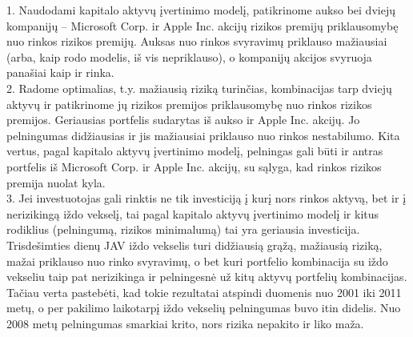 \documentclass[12pt, a14paper, lithuanian]{article}
\begin{document}
\newpage      
{}

1. Naudodami kapitalo aktyvų įvertinimo modelį, patikrinome aukso bei dviejų kompanijų -- Microsoft Corp. ir Apple Inc. akcijų rizikos premijų priklausomybę nuo rinkos rizikos premijų. Auksas nuo rinkos svyravimų priklauso mažiausiai (arba, kaip rodo modelis, iš vis nepriklauso), o kompanijų akcijos svyruoja panašiai kaip ir rinka.\\

2. Radome optimalias, t.y. mažiausią riziką turinčias, kombinacijas tarp dviejų aktyvų ir patikrinome jų rizikos premijos priklausomybę nuo rinkos rizikos premijos. Geriausias portfelis sudarytas iš aukso ir Apple Inc. akcijų. Jo pelningumas didžiausias ir jis mažiausiai priklauso nuo rinkos nestabilumo. Kita vertus, pagal kapitalo aktyvų įvertinimo modelį, pelningas gali būti ir antras portfelis iš Microsoft Corp. ir Apple Inc. akcijų, su sąlyga, kad rinkos rizikos premija nuolat kyla.\\


3. Jei investuotojas gali rinktis ne tik investiciją į kurį nors rinkos aktyvą, bet ir į nerizikingą iždo vekselį, tai pagal kapitalo aktyvų įvertinimo modelį ir kitus rodiklius (pelningumą, rizikos minimalumą) tai yra geriausia investicija. Trisdešimties dienų JAV iždo vekselis turi didžiausią grąžą, mažiausią riziką, mažai priklauso nuo rinko svyravimų, o bet kuri portfelio kombinacija su iždo vekseliu taip pat nerizikinga ir pelningesnė už kitų aktyvų portfelių kombinacijas. Tačiau verta pastebėti, kad tokie rezultatai atspindi duomenis nuo 2001 iki 2011 metų, o per pakilimo laikotarpį iždo vekselių pelningumas buvo itin didelis. Nuo 2008 metų pelningumas smarkiai krito, nors rizika nepakito ir liko maža. \\



\newpage
{}
\end{document}
